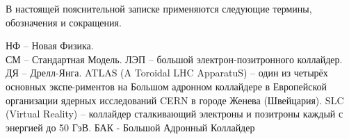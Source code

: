 В настоящей пояснительной записке применяются следующие термины, обозначения и сокращения.

НФ – Новая Физика.\\

СМ – Стандартная Модель.
ЛЭП – большой электрон-позитронного коллайдер.
ДЯ – Дрелл-Янга.
ATLAS (A Toroidal LHC ApparatuS) – один из четырёх основных экспе-риментов на Большом адронном коллайдере в Европейской организации ядерных исследований CERN в городе Женева (Швейцария).
SLC (Virtual Reality) – коллайдер сталкивающий электроны и позитроны каждый с энергией до 50 ГэВ.
БАК - Большой Адронный Коллайдер